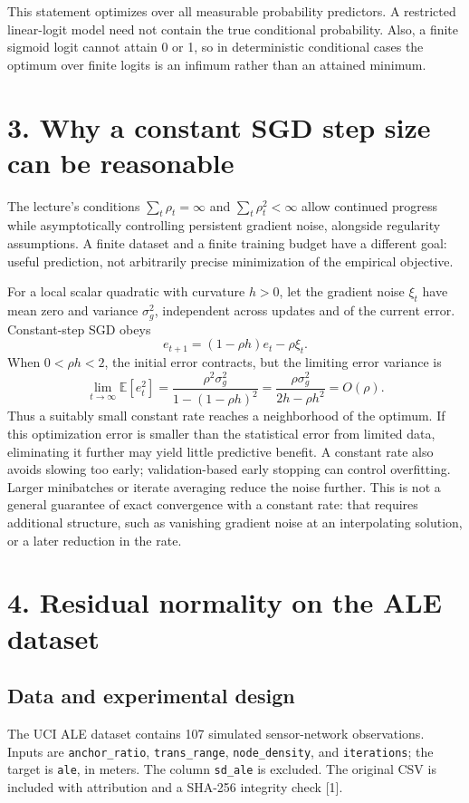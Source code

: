 \documentclass[10pt,letterpaper]{article}
\newcommand{\E}{\mathbb{E}}
\newcommand{\code}[1]{\texttt{#1}}
\begin{document}
This statement optimizes over all measurable probability predictors. A restricted
linear-logit model need not contain the true conditional probability. Also, a
finite sigmoid logit cannot attain 0 or 1, so in deterministic conditional cases
the optimum over finite logits is an infimum rather than an attained minimum.

\section*{3. Why a constant SGD step size can be reasonable}
The lecture's conditions $\sum_t\rho_t=\infty$ and $\sum_t\rho_t^2<\infty$
allow continued progress while asymptotically controlling persistent gradient
noise, alongside regularity assumptions. A finite dataset and
a finite training budget have a different goal: useful prediction, not arbitrarily
precise minimization of the empirical objective.

For a local scalar quadratic with curvature $h>0$, let the gradient noise
$\xi_t$ have mean zero and variance $\sigma_g^2$, independent across updates and
of the current error. Constant-step SGD obeys
\[
e_{t+1}=(1-\rho h)e_t-\rho\xi_t.
\]
When $0<\rho h<2$, the initial error contracts, but the limiting error variance is
\[
\lim_{t\to\infty}\E[e_t^2]
=\frac{\rho^2\sigma_g^2}{1-(1-\rho h)^2}
=\frac{\rho\sigma_g^2}{2h-\rho h^2}=O(\rho).
\]
Thus a suitably small constant rate reaches a neighborhood of the optimum.
If this optimization error is smaller than the statistical error from limited
data, eliminating it further may yield little predictive benefit. A constant
rate also avoids slowing too early; validation-based early stopping can control
overfitting. Larger minibatches or iterate averaging reduce the noise further.
This is not a general guarantee of exact convergence with a constant rate:
that requires additional structure, such as vanishing gradient noise at an
interpolating solution, or a later reduction in the rate.

\newpage
\section*{4. Residual normality on the ALE dataset}
\subsection*{Data and experimental design}
The UCI ALE dataset contains 107 simulated sensor-network observations. Inputs
are \code{anchor\_ratio}, \code{trans\_range}, \code{node\_density}, and
\code{iterations}; the target is \code{ale}, in meters. The column
\code{sd\_ale} is excluded. The original CSV is included with attribution and a
SHA-256 integrity check [1].
\end{document}
